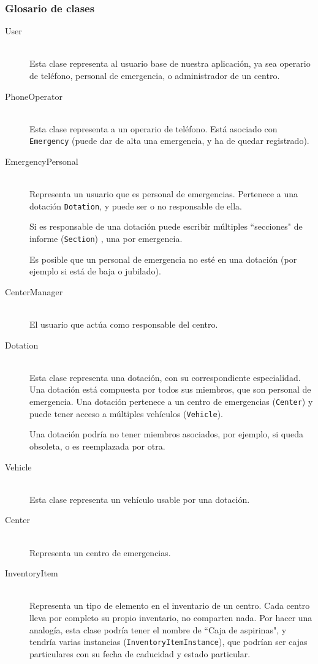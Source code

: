 \subsubsection{Glosario de clases}
\begin{description}
    \item[User] \hfill \\
        Esta clase representa al usuario base de nuestra aplicación, ya sea operario de teléfono, personal de emergencia, o administrador de un centro.
    \item[PhoneOperator] \hfill \\
        Esta clase representa a un operario de teléfono. Está asociado con \texttt{Emergency} (puede dar de alta una emergencia, y ha de quedar registrado).
    \item[EmergencyPersonal] \hfill \\
        Representa un usuario que es personal de emergencias. Pertenece a una dotación \texttt{Dotation}, y puede ser o no responsable de ella. \par
        Si es responsable de una dotación puede escribir múltiples ``secciones" de informe (\texttt{Section}) , una por emergencia. \par
        Es posible que un personal de emergencia no esté en una dotación (por ejemplo si está de baja o jubilado).
    \item[CenterManager] \hfill \\
        El usuario que actúa como responsable del centro.
    \item[Dotation] \hfill \\
        Esta clase representa una dotación, con su correspondiente especialidad. Una dotación está compuesta por todos sus miembros, que son personal de emergencia. Una dotación pertenece a un centro de emergencias (\texttt{Center}) y puede tener acceso a múltiples vehículos (\texttt{Vehicle}). \par
        Una dotación podría no tener miembros asociados, por ejemplo, si queda obsoleta, o es reemplazada por otra.
    \item[Vehicle] \hfill \\
        Esta clase representa un vehículo usable por una dotación.
    \item[Center] \hfill \\
        Representa un centro de emergencias.
    \item[InventoryItem] \hfill \\
        Representa un tipo de elemento en el inventario de un centro. Cada centro lleva por completo su propio inventario, no comparten nada. Por hacer una analogía, esta clase podría tener el nombre de ``Caja de aspirinas", y tendría varias instancias (\texttt{InventoryItemInstance}), que podrían ser cajas particulares con su fecha de caducidad y estado particular. \par

\end{description}
